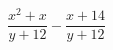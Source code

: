 \begin{ex}
	\begin{condition}
		\( \dfrac{x^2+x}{y+12}-\dfrac{x+14}{y+12} \)
	\end{condition}
\end{ex}
